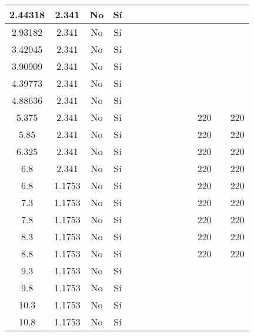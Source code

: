 \begin{table}[H]
{\begin{tabular}{|c|c|c|c|c|c|c|c|c|c|c|c|c|c|}
\hline
2.44318 & 2.341 & No  & Sí  &     &     &     &     &     &     &     &     &     &  \bigstrut\\
\hline
2.93182 & 2.341 & No  & Sí  &     &     &     &     &     &     &     &     &     &  \bigstrut\\
\hline
3.42045 & 2.341 & No  & Sí  &     &     &     &     &     &     &     &     &     &  \bigstrut\\
\hline
3.90909 & 2.341 & No  & Sí  &     &     &     &     &     &     &     &     &     &  \bigstrut\\
\hline
4.39773 & 2.341 & No  & Sí  &     &     &     &     &     &     &     &     &     &  \bigstrut\\
\hline
4.88636 & 2.341 & No  & Sí  &     &     &     &     &     &     &     &     &     &  \bigstrut\\
\hline
5.375 & 2.341 & No  & Sí  &     &     &     &     &     &     &     & 220 &     & 220 \bigstrut\\
\hline
5.85 & 2.341 & No  & Sí  &     &     &     &     &     &     &     & 220 &     & 220 \bigstrut\\
\hline
6.325 & 2.341 & No  & Sí  &     &     &     &     &     &     &     & 220 &     & 220 \bigstrut\\
\hline
6.8 & 2.341 & No  & Sí  &     &     &     &     &     &     &     & 220 &     & 220 \bigstrut\\
\hline
6.8 & 1.1753 & No  & Sí  &     &     &     &     &     &     &     & 220 &     & 220 \bigstrut\\
\hline
7.3 & 1.1753 & No  & Sí  &     &     &     &     &     &     &     & 220 &     & 220 \bigstrut\\
\hline
7.8 & 1.1753 & No  & Sí  &     &     &     &     &     &     &     & 220 &     & 220 \bigstrut\\
\hline
8.3 & 1.1753 & No  & Sí  &     &     &     &     &     &     &     & 220 &     & 220 \bigstrut\\
\hline
8.8 & 1.1753 & No  & Sí  &     &     &     &     &     &     &     & 220 &     & 220 \bigstrut\\
\hline
9.3 & 1.1753 & No  & Sí  &     &     &     &     &     &     &     &     &     &  \bigstrut\\
\hline
9.8 & 1.1753 & No  & Sí  &     &     &     &     &     &     &     &     &     &  \bigstrut\\
\hline
10.3 & 1.1753 & No  & Sí  &     &     &     &     &     &     &     &     &     &  \bigstrut\\
\hline
10.8 & 1.1753 & No  & Sí  &     &     &     &     &     &     &     &     &     &  \bigstrut\\

\end{tabular}}
\end{table}
